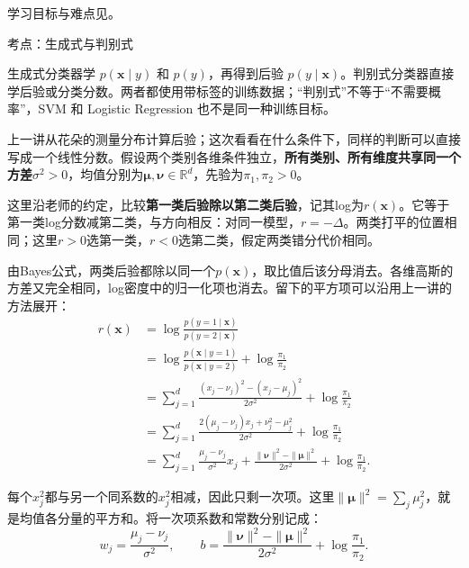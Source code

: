 学习目标与难点见。








考点：生成式与判别式

生成式分类器学 \(p(\mathbf x\mid y)\) 和 \(p(y)\)，再得到后验 \(p(y\mid\mathbf x)\)。判别式分类器直接学后验或分类分数。两者都使用带标签的训练数据；“判别式”不等于“不需要概率”，SVM 和 Logistic Regression 也不是同一种训练目标。


上一讲从花朵的测量分布计算后验；这次看看在什么条件下，同样的判断可以直接写成一个线性分数。假设两个类别各维条件独立，\textbf{所有类别、所有维度共享同一个方差\(\sigma^2>0\)}，均值分别为\(\boldsymbol\mu,\boldsymbol\nu\in\mathbb R^d\)，先验为\(\pi_1,\pi_2>0\)。


这里沿老师的约定，比较\textbf{第一类后验除以第二类后验}，记其log为\(r(\mathbf x)\)。它等于第一类log分数减第二类，与方向相反：对同一模型，\(r=-\Delta\)。两类打平的位置相同；这里\(r>0\)选第一类，\(r<0\)选第二类，假定两类错分代价相同。


由Bayes公式，两类后验都除以同一个\(p(\mathbf x)\)，取比值后该分母消去。各维高斯的方差又完全相同，log密度中的归一化项也消去。留下的平方项可以沿用上一讲的方法展开：
\[
\begin{aligned}
r(\mathbf x)&=\log\frac{p(y=1\mid\mathbf x)}{p(y=2\mid\mathbf x)}\\
&=\log\frac{p(\mathbf x\mid y=1)}{p(\mathbf x\mid y=2)}
 +\log\frac{\pi_1}{\pi_2}\\
&=\sum_{j=1}^d\frac{(x_j-\nu_j)^2-(x_j-\mu_j)^2}{2\sigma^2}
 +\log\frac{\pi_1}{\pi_2}\\
&=\sum_{j=1}^d\frac{2(\mu_j-\nu_j)x_j+\nu_j^2-\mu_j^2}{2\sigma^2}
 +\log\frac{\pi_1}{\pi_2}\\
&=\sum_{j=1}^d\frac{\mu_j-\nu_j}{\sigma^2}x_j
 +\frac{\|\boldsymbol\nu\|^2-\|\boldsymbol\mu\|^2}{2\sigma^2}
 +\log\frac{\pi_1}{\pi_2}.
\end{aligned}\tag{3.1}
\]


每个\(x_j^2\)都与另一个同系数的\(x_j^2\)相减，因此只剩一次项。这里\(\|\boldsymbol\mu\|^2=\sum_j\mu_j^2\)，就是均值各分量的平方和。将一次项系数和常数分别记成：
\[
w_j=\frac{\mu_j-\nu_j}{\sigma^2},\qquad
b=\frac{\|\boldsymbol\nu\|^2-\|\boldsymbol\mu\|^2}{2\sigma^2}
 +\log\frac{\pi_1}{\pi_2}.
\tag{3.1a}
\]


